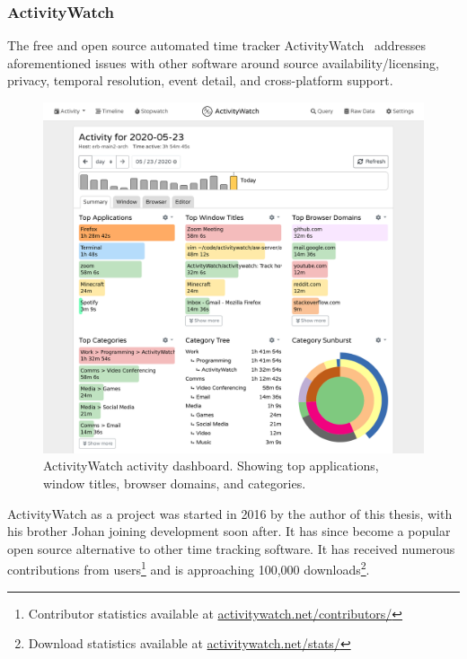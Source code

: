 \documentclass[a4paper]{article}
\begin{document}
\begin{refsection}
    \subsubsection{ActivityWatch}

        The free and open source automated time tracker ActivityWatch~\cite{bjareholt_activitywatch_2020} addresses aforementioned issues with other software around source availability/licensing, privacy, temporal resolution, event detail, and cross-platform support.


        \begin{figure}[h]
        \centering
        \includegraphics[width=12cm]{img/screenshot-aw-activity.png}
        \caption{ActivityWatch activity dashboard. Showing top applications, window titles, browser domains, and categories.}\label{fig:aw}
        \end{figure}

        ActivityWatch as a project was started in 2016 by the author of this thesis, with his brother Johan joining development soon after. It has since become a popular open source alternative to other time tracking software. It has received numerous contributions from users\footnote{Contributor statistics available at \href{https://activitywatch.net/contributors/}{activitywatch.net/contributors/}} and is approaching 100,000 downloads\footnote{Download statistics available at \href{https://activitywatch.net/stats/}{activitywatch.net/stats/}}.


\end{refsection}
\end{document}

